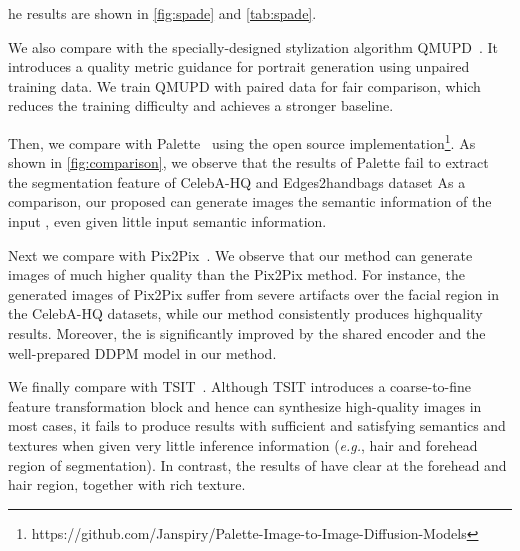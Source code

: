 he results are shown in \cref{fig:spade} and \cref{tab:spade}.

We also compare with the specially-designed stylization algorithm QMUPD~\cite{YiLLR22}.
%
It introduces a quality metric guidance for portrait generation using unpaired training data.
%
We train QMUPD with paired data for fair comparison, which reduces the training difficulty and achieves a stronger baseline. 
%

Then, we compare with Palette~\cite{saharia2021palette} using the open source implementation\footnote{https://github.com/Janspiry/Palette-Image-to-Image-Diffusion-Models}.
%
As shown in \cref{fig:comparison}, we observe that the results of Palette fail to extract the segmentation feature of CelebA-HQ and Edges2handbags dataset
%
As a comparison, our proposed \method can generate  images  the semantic information of the input , even  given little input semantic information.

Next\sqq{,} we compare with Pix2Pix~\cite{isola2017image}.
%
We observe that our method can generate images of much higher quality than the Pix2Pix method.
%
For instance, the generated images of Pix2Pix suffer from severe artifacts over the facial region in the CelebA-HQ datasets, while our method consistently produces high\sqq{-}quality results.
%
Moreover, the  is significantly improved by the shared encoder and the well-prepared DDPM model in our method.

We finally compare with TSIT~\cite{jiang2020tsit}.
%
Although TSIT introduces a coarse-to-fine feature transformation block and hence can synthesize high-quality images in most cases, it fails to produce results with sufficient and satisfying semantics and textures when given very little inference information (\textit{e.g.}, hair and forehead region of segmentation).
%
In contrast, the results of \method have clear  at the forehead and hair region, together with rich texture.

